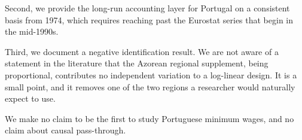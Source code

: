 Second, we provide the long-run accounting layer for Portugal on a consistent
basis from 1974, which requires reaching past the Eurostat series that begin in
the mid-1990s.

Third, we document a negative identification result. We are not aware of a
statement in the literature that the Azorean regional supplement, being
proportional, contributes no independent variation to a log-linear design. It is
a small point, and it removes one of the two regions a researcher would naturally
expect to use.

We make no claim to be the first to study Portuguese minimum wages, and no claim
about causal pass-through.

